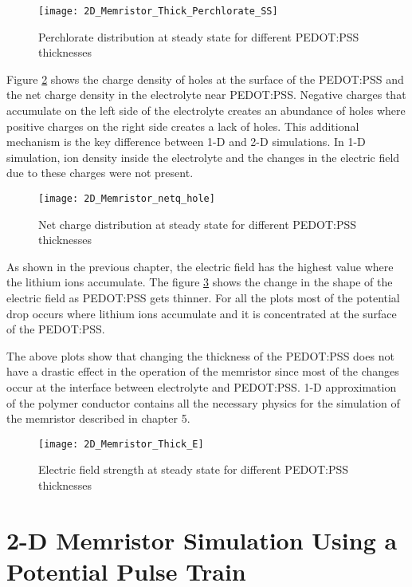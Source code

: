 \begin{doublespace}
\begin{figure}[!htp]
\centering
\texttt{[image: 2D\_Memristor\_Thick\_Perchlorate\_SS]}
\caption{Perchlorate distribution at steady state for different PEDOT:PSS thicknesses} 
\label{thick_perch_ss}
\end{figure}

Figure \ref{thick_netq_p} shows the charge density of holes at the surface of the PEDOT:PSS and the net charge density in the electrolyte near PEDOT:PSS. Negative charges that accumulate on the left side of the electrolyte creates an abundance of holes where positive charges on the right side creates a lack of holes. This additional mechanism is the key difference between 1-D and 2-D simulations. In 1-D simulation, ion density inside the electrolyte and the changes in the electric field due to these charges were not present.

\begin{figure}[!htp]
\centering
\texttt{[image: 2D\_Memristor\_netq\_hole]}
\caption{Net charge distribution at steady state for different PEDOT:PSS thicknesses} 
\label{thick_netq_p}
\end{figure}

As shown in the previous chapter, the electric field has the highest value where the lithium ions accumulate. The figure \ref{thick_efield} shows the change in the shape of the electric field as PEDOT:PSS gets thinner. For all the plots most of the potential drop occurs where lithium ions accumulate and it is concentrated at the surface of the PEDOT:PSS. 

The above plots show that changing the thickness of the PEDOT:PSS does not have a drastic effect in the operation of the memristor since most of the changes occur at the interface between electrolyte and PEDOT:PSS. 1-D approximation of the polymer conductor contains all the necessary physics for the simulation of the memristor described in chapter 5.

\begin{figure}[!htp]
\centering
\texttt{[image: 2D\_Memristor\_Thick\_E]}
\caption{Electric field strength at steady state for different PEDOT:PSS thicknesses} 
\label{thick_efield}
\end{figure}


\clearpage
\section{2-D Memristor Simulation Using a Potential Pulse Train}


\end{doublespace}
